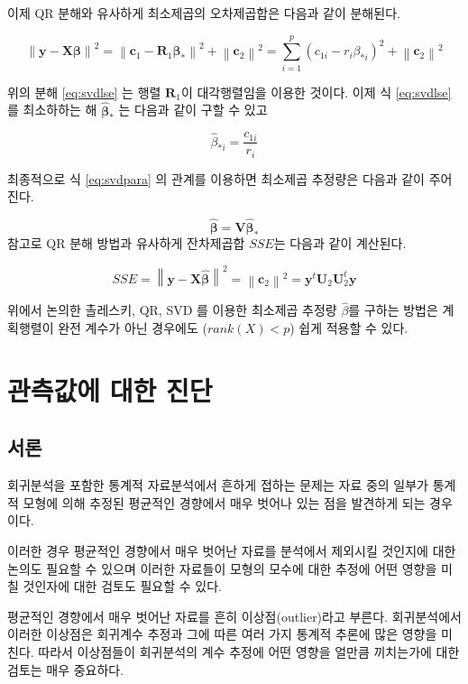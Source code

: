 \documentclass[
  10pt,
]{book}
\makeatletter
\newcommand{\norm}[1]{\left\lVert#1\right\rVert}
\newenvironment{kframe}{%
\medskip{}
\setlength{\fboxsep}{.8em}
 \def\at@end@of@kframe{}%
 \ifinner\ifhmode%
  \def\at@end@of@kframe{\end{minipage}}%
  \begin{minipage}{\columnwidth}%
 \fi\fi%
 \def\FrameCommand##1{\hskip\@totalleftmargin \hskip-\fboxsep
 \colorbox{shadecolor}{##1}\hskip-\fboxsep
     \hskip-\linewidth \hskip-\@totalleftmargin \hskip\columnwidth}%
 \MakeFramed {\advance\hsize-\width
   \@totalleftmargin\z@ \linewidth\hsize
   \@setminipage}}%
 {\par\unskip\endMakeFramed%
 \at@end@of@kframe}
\newenvironment{rmdblock}[1]
  {
  \begin{itemize}
  \renewcommand{\labelitemi}{
    \raisebox{-.7\height}[0pt][0pt]{
      {\setkeys{Gin}{width=3em,keepaspectratio}\texttt{[image: images/\#1]}}
    }
  }
  \setlength{\fboxsep}{1em}
  \begin{kframe}
  \item
  }
  {
  \end{kframe}
  \end{itemize}
  }
\newenvironment{rmdnote}
  {\begin{rmdblock}{note}}
  {\end{rmdblock}}
\theoremstyle{definition}
\theoremstyle{definition}
\theoremstyle{definition}
\theoremstyle{definition}
\theoremstyle{remark}
\makeatother
\begin{document}
이제 QR 분해와 유사하게 최소제곱의 오차제곱합은 다음과 같이 분해된다.

\begin{equation}
\norm{ \bm y-\bm X \bm \beta}^2  = 
\norm{ \bm c_1 - \bm R_1 \bm \beta_* }^2 + \norm{\bm c_2}^2 
 =\sum_{i=1}^p (c_{1i} - r_i \beta_{*i})^2 + \norm{\bm c_2}^2 
\label{eq:svdlse}
\end{equation}

위의 분해 \eqref{eq:svdlse} 는 행렬 \(\bm R_1\)이 대각행렬임을 이용한 것이다. 이제 식 \eqref{eq:svdlse} 를 최소하하는 해
\(\hat {\bm \beta}_*\) 는 다음과 같이 구할 수 있고

\[ \hat \beta_{*i} =\frac{ c_{1i}}{r_i} \]

최종적으로 식 \eqref{eq:svdpara} 의 관계를 이용하면 최소제곱 추정량은 다음과 같이 주어진다.

\[ \hat {\bm \beta} = \bm V \hat {\bm \beta}_* \]
참고로 QR 분해 방법과 유사하게 잔차제곱합 \(SSE\)는 다음과 같이 계산된다.

\[ SSE = \norm{ \bm y-\bm X \hat {\bm \beta}}^2 = \norm{\bm c_2}^2 = \bm y^t \bm U_2 \bm U_2^t \bm y \]

\begin{rmdnote}
위에서 논의한 촐레스키, QR, SVD 를 이용한 최소제곱 추정량 \(\hat \beta\)를 구하는 방법은 계획행렬이
완전 계수가 아닌 경우에도 (\(rank(X)<p\)) 쉽게 적용할 수 있다.
\end{rmdnote}

\hypertarget{residual}{%
\chapter{관측값에 대한 진단}\label{residual}}

\hypertarget{uxc11cuxb860}{%
\section{서론}\label{uxc11cuxb860}}

회귀분석을 포함한 통계적 자료분석에서 흔하게 접하는 문제는 자료 중의
일부가 통계적 모형에 의해 추정된 평균적인 경향에서 매우 벗어나 있는 점을
발견하게 되는 경우이다.

이러한 경우 평균적인 경향에서 매우 벗어난 자료를 분석에서 제외시킬
것인지에 대한 논의도 필요할 수 있으며 이러한 자료들이 모형의 모수에 대한
추정에 어떤 영향을 미칠 것인자에 대한 검토도 필요할 수 있다.

평균적인 경향에서 매우 벗어난 자료를 흔히 이상점(outlier)라고 부른다.
회귀분석에서 이러한 이상점은 회귀계수 추정과 그에 따른 여러 가지 통계적
추론에 많은 영향을 미친다. 따라서 이상점들이 회귀분석의 계수 추정에 어떤
영향을 얼만큼 끼치는가에 대한 검토는 매우 중요하다.
\end{document}
